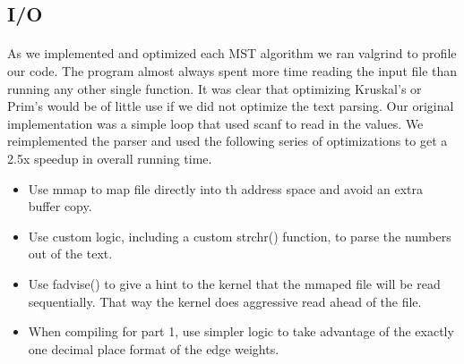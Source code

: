 \subsection{I/O}
\label{sec:deep:io}

\paragraph{}
As we implemented and optimized each MST algorithm we ran valgrind to
profile our code. The program almost always spent more time reading the
input file than running any other single function. It was clear that
optimizing Kruskal's or Prim's would be of little use if we did not
optimize the text parsing. Our original implementation was a simple loop
that used scanf to read in the values. We reimplemented the parser and used
the following series of optimizations
to get a 2.5x speedup in overall running time.
\begin{itemize}
\item
Use mmap to map file directly into th address space and avoid an extra
buffer copy.
\item
Use custom logic, including a custom strchr() function, to parse the
numbers out of the text.
\item
Use fadvise() to give a hint to the kernel that the mmaped file will be
read sequentially. That way the kernel does aggressive read ahead of the
file.
\item
When compiling for part 1, use simpler logic to take advantage of the exactly
one decimal place format of the edge weights.
\end{itemize}
